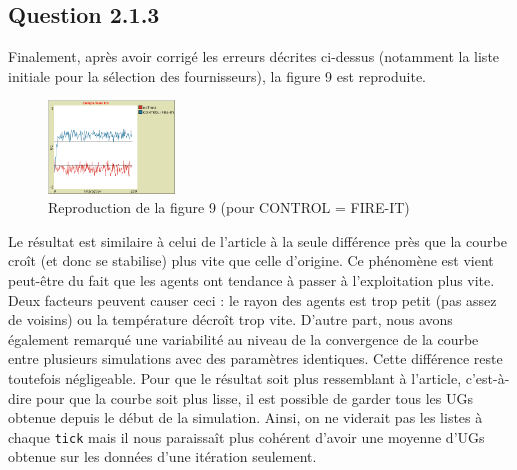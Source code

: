 \subsection{Question 2.1.3}
Finalement, après avoir corrigé les erreurs décrites ci-dessus (notamment la liste initiale pour la sélection des fournisseurs), la figure 9 est reproduite.

\begin{figure}[H]
\centering
\captionsetup{justification=centering}
\includegraphics[width=0.3\textwidth]{images/evolutionIT/IT5.png}
\caption{Reproduction de la figure 9 (pour CONTROL = FIRE-IT)}
\label{fig:fig9}
\end{figure}

Le résultat est similaire à celui de l'article à la seule différence près que la courbe croît (et donc se stabilise) plus vite que celle d'origine. Ce phénomène est vient peut-être du fait que les agents ont tendance à passer à l'exploitation plus vite. Deux facteurs peuvent causer ceci : le rayon des agents est trop petit (pas assez de voisins) ou la température décroît trop vite. D'autre part, nous avons également remarqué une variabilité au niveau de la convergence de la courbe entre plusieurs simulations avec des paramètres identiques. Cette différence reste toutefois négligeable.
Pour que le résultat soit plus ressemblant à l'article, c'est-à-dire pour que la courbe soit plus lisse, il est possible de garder tous les UGs obtenue depuis le début de la simulation. Ainsi, on ne viderait pas les listes à chaque \texttt{tick} mais il nous paraissaît plus cohérent d'avoir une moyenne d'UGs obtenue sur les données d'une itération seulement.